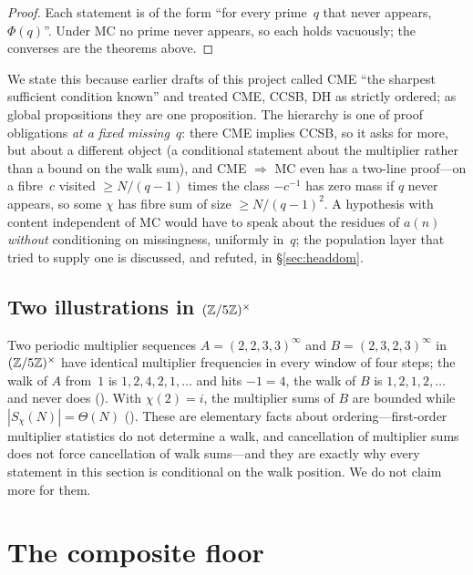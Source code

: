 \documentclass[10pt,a4paper]{article}
\begin{document}
\begin{proof}
Each statement is of the form ``for every prime~$q$ that never appears,
$\Phi(q)$''.  Under MC no prime never appears, so each holds vacuously;
the converses are the theorems above.
\end{proof}

We state this because earlier drafts of this project called CME ``the
sharpest sufficient condition known'' and treated CME, CCSB, DH as
strictly ordered; as global propositions they are one proposition.  The
hierarchy is one of proof obligations \emph{at a fixed missing~$q$}: there
CME implies CCSB, so it asks for more, but about a different object (a
conditional statement about the multiplier rather than a bound on the walk
sum), and CME $\Rightarrow$ MC
even has a two-line proof---on a fibre~$c$ visited $\ge N/(q-1)$ times the
class $-c^{-1}$ has zero mass if $q$ never appears, so some $\chi$ has fibre
sum of size $\ge N/(q-1)^2$.  A hypothesis with content independent of MC
would have to speak about the residues of $a(n)$ \emph{without}
conditioning on missingness, uniformly in~$q$; the population layer that
tried to supply one is discussed, and refuted, in \S\ref{sec:headdom}.

\subsection{Two illustrations in $(\mathbb{Z}/5\mathbb{Z})^\times$}

Two periodic multiplier sequences $A=(2,2,3,3)^\infty$ and
$B=(2,3,2,3)^\infty$ in $(\mathbb{Z}/5\mathbb{Z})^\times$ have identical multiplier
frequencies in every window of four steps; the walk of $A$ from~$1$ is
$1,2,4,2,1,\dots$ and hits $-1=4$, the walk of $B$ is $1,2,1,2,\dots$ and
never does
().
With $\chi(2)=i$, the multiplier sums of $B$ are bounded while
$|S_\chi(N)|=\Theta(N)$
().  These
are elementary facts about ordering---first-order multiplier statistics do
not determine a walk, and cancellation of multiplier sums does not force
cancellation of walk sums---and they are exactly why every statement in
this section is conditional on the walk position.  We do not claim more
for them.

\section{The composite floor}
\label{sec:floor}
\end{document}
